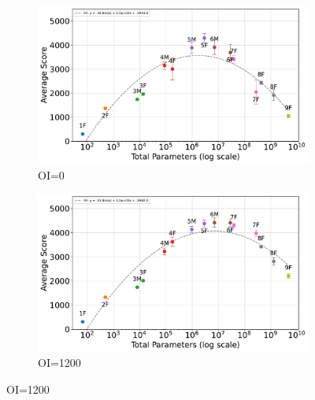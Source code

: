 \begin{figure}[t]
    \centering
    \begin{subfigure}[b]{\linewidth}
        \centering
        \includegraphics[width=\linewidth]{pdf/parameter_performance_plots/params_performance_OI0_EXP1.pdf}
        \caption{OI=0}
        \label{fig:score_vs_tuple_OI0}
    \end{subfigure}

    \vspace{1em}
    \begin{subfigure}[b]{\linewidth}
        \centering
        \includegraphics[width=\linewidth]{pdf/parameter_performance_plots/params_performance_OI1200_EXP1.pdf}
        \caption{OI=1200}
        \label{fig:score_vs_tuple_OI1200}
    \end{subfigure}


\end{figure}
